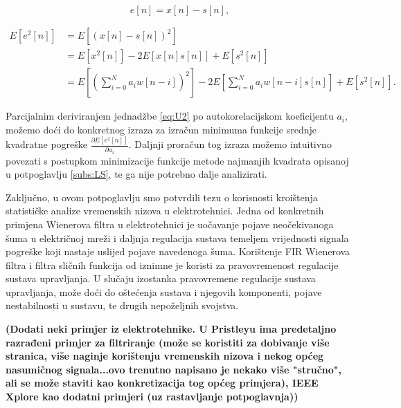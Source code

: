 \documentclass[a4paper,12pt,oneside]{memoir}
\begin{document}
            \begin{equation}
                e[n]=x[n]-s[n],
            \end{equation}
        
            \begin{equation}
                \begin{split}
                    E\left[e^2[n]\right]&=E\left[\left(x[n]-s[n]\right)^2\right] \\
                    & = E\left[x^2[n]\right]-2E\left[x[n]s[n]\right]+E\left[s^2[n]\right] \\
                    & = E\left[\left(\displaystyle\sum_{i=0}^{N}a_i w[n-i]\right)^2\right]-2E\left[\displaystyle\sum_{i=0}^{N}a_i w[n-i]s[n]\right]+E\left[s^2[n]\right].
                \end{split}
                \label{eq:U2}
            \end{equation}

            Parcijalnim deriviranjem jednadžbe \ref{eq:U2} po autokorelacijskom koeficijentu $a_i$, možemo doći do konkretnog izraza za izračun minimuma funkcije srednje kvadratne pogreške $\frac{\partial E[e^2[n]]}{\partial a_i}$. Daljnji proračun tog izraza možemo intuitivno povezati s postupkom minimizacije funkcije metode najmanjih kvadrata opisanoj u potpoglavlju \ref{subs:LS}, te ga nije potrebno dalje analizirati.
            
            Zaključno, u ovom potpoglavlju smo potvrdili tezu o korisnosti kroištenja statističke analize vremenskih nizova u elektrotehnici. Jedna od konkretnih primjena Wienerova filtra u elektrotehnici je uočavanje pojave neočekivanoga šuma u električnoj mreži i daljnja regulacija sustava temeljem vrijednosti signala pogreške koji nastaje uslijed pojave navedenoga šuma. Korištenje FIR Wienerova filtra i filtra sličnih funkcija od iznimne je koristi za pravovremenost regulacije sustava upravljanja. U slučaju izostanka pravovremene regulacije sustava upravljanja, može doći do oštećenja sustava i njegovih komponenti, pojave nestabilnosti u sustavu, te drugih nepoželjnih svojstva.

            \textbf{(Dodati neki primjer iz elektrotehnike. U Pristleyu ima predetaljno razrađeni primjer za filtriranje (može se koristiti za dobivanje više stranica, više naginje korištenju vremenskih nizova i nekog općeg nasumičnog signala...ovo trenutno napisano je nekako više "stručno", ali se može staviti kao konkretizacija tog općeg primjera), IEEE Xplore kao dodatni primjeri (uz rastavljanje potpoglavnja))}
\end{document}
